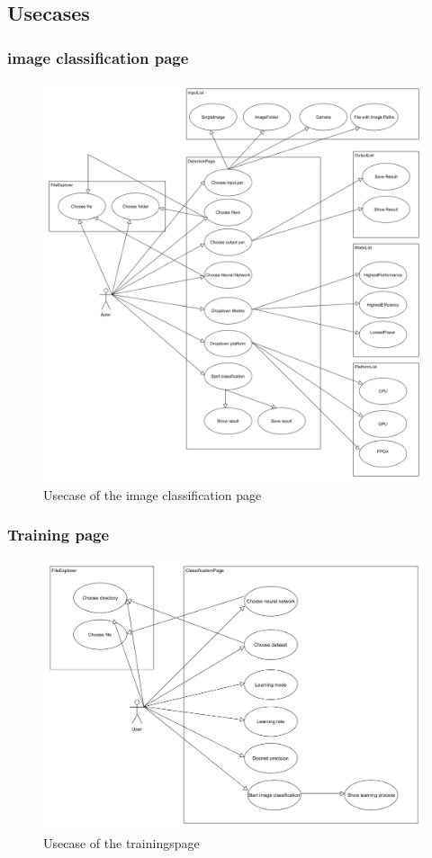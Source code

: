 \documentclass[parskip=full]{scrartcl}
\begin{document}
\subsection{Usecases}
\subsubsection{\gls{image classification} page}
\begin{figure}[htb!]
\centering
\includegraphics[width=\textwidth]{ClassificationUsecase}
\caption{Usecase of the \gls{image classification} page}
\end{figure}
\subsubsection{Training page}
\begin{figure}[htb!]
\centering
\includegraphics[width=\textwidth]{TrainUsecase}
\caption{Usecase of the trainingspage}
\end{figure}
\clearpage
\end{document}
